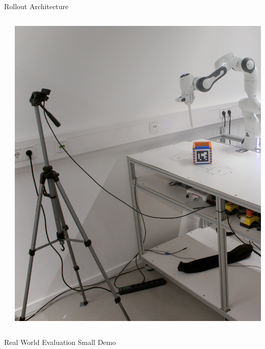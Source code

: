 \documentclass[16:9,en,navbarinfooter]{sdqbeamer}
\begin{document}
\begin{frame}{Rollout Architecture}
\begin{columns}
\begin{column}{0.45\textwidth}
    \end{column}
    \begin{column}{0.35\textwidth}
    \vspace{1cm}
\includegraphics[width=\linewidth]{media/labsetup2.jpg}

    \end{column}
    \end{columns}

\end{frame}

\begin{frame}{Real World Evaluation}
    \center
    Small Demo
\end{frame}
\end{document}
